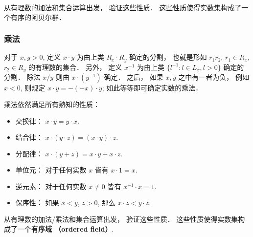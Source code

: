 \begin{exercise}{}
从有理数的加法和集合运算出发， 验证这些性质． 这些性质使得实数集构成了一个有序的阿贝尔群．
\end{exercise}

\subsubsection{乘法}

对于 $x,y>0$, 定义 $x\cdot y$ 为由上类 $R_x\cdot R_y$ 确定的分割， 也就是形如 $r_1r_2$, $r_1\in R_x$, $r_2\in R_y$ 的有理数的集合． 另外， 定义 $x^{-1}$ 为由上类 $\{l^{-1}:l\in L_x,l>0\}$ 确定的分割． 除法 $x/y$ 则由 $x\cdot(y^{-1})$ 确定． 之后， 如果 $x,y$ 之中有一者为负， 例如 $x<0$, 则规定 $x\cdot y=-(-x)\cdot y$; 如此等等即可确定实数的乘法． 

乘法依然满足所有熟知的性质：

\begin{itemize}
\item 交换律： $x\cdot y=y\cdot x$.
\item 结合律： $x\cdot (y\cdot z)=(x\cdot y)\cdot z$.
\item 分配律： $x\cdot (y+z)=x\cdot y+x\cdot z$.
\item 单位元： 对于任何实数 $x$ 皆有 $x\cdot 1=x$.
\item 逆元素： 对于任何实数 $x\neq0$ 皆有 $x^{-1}\cdot x=1$.
\item 保序性： 如果 $x<y$, $z>0$, 那么 $x\cdot z<y\cdot z$.
\end{itemize}

\begin{exercise}{}
从有理数的加法/乘法和集合运算出发， 验证这些性质． 这些性质使得实数集构成了一个\textbf{有序域 （ordered field）}.
\end{exercise}
